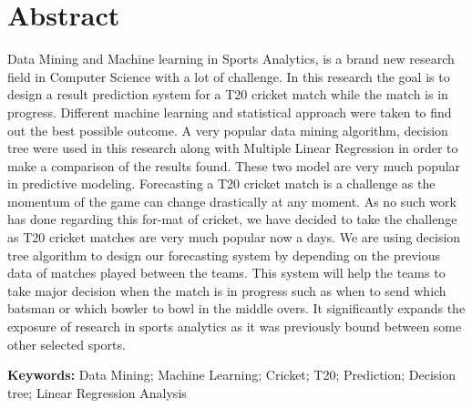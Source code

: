 \section*{Abstract}
Data Mining and Machine learning in Sports Analytics, is a brand new
research field in Computer Science with a lot of challenge. In this research the goal is to design a result prediction system for a T20 cricket match while the match is in progress. Different machine learning and statistical approach were taken to find out the best possible outcome. A very popular data mining algorithm, decision tree were used in this research along with Multiple Linear Regression in order to make a comparison of the results found. These two model are very much popular in predictive modeling. Forecasting a T20 cricket match is a challenge as the momentum of the game can change drastically at any moment. As no such work has done regarding this for-mat of cricket, we have decided to take the challenge as T20 cricket matches are very much popular now a days. We are using decision tree algorithm to design our forecasting system by depending on the previous data of matches played between the teams. This system will help the teams to take major decision when the match is in progress such as when to send which batsman or which bowler to bowl in the middle overs. It significantly expands the exposure of research in sports analytics as it was previously bound between some other selected sports.

\vspace{1cm}
\textbf{Keywords:} Data Mining; Machine Learning; Cricket; T20; Prediction; Decision tree; Linear Regression Analysis
\pagebreak
